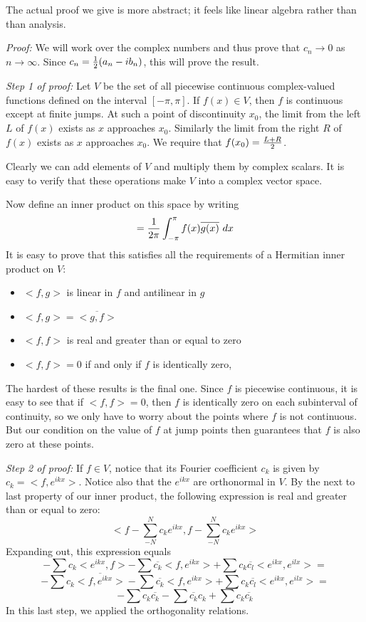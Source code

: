 \documentclass[11pt, oneside]{article}   	%
\begin{document}
The actual proof we give is more abstract; it feels  like linear algebra rather than than analysis.

{\em Proof:} We will work over the complex numbers and thus prove that $c_n \rightarrow 0$ as $n \rightarrow \infty$. Since $c_n = {1 \over 2} (a_n - i b_n)$, this will prove the result.

{\em Step 1 of proof:} Let $V$ be the set of all piecewise continuous complex-valued functions defined on the interval
$[ - \pi, \pi]$. If $f(x) \in V$, then $f$ is continuous except at finite jumps. At such a point of discontinuity $x_0$,
the limit from the left $L$ of $f(x)$ exists as $x$ approaches $x_0$. Similarly the limit from the right $R$ of $f(x)$ exists as $x$ approaches $x_0$. We require that $f(x_0) = {{L + R} \over 2}$.

Clearly we can add elements of $V$ and multiply them by complex scalars. It is easy to verify that these operations make $V$ into a complex vector space.

Now define an inner product on this space by writing \[< f, g > = {1 \over {2 \pi}} \int_{- \pi}^\pi f(x) \overline{g(x)} \ dx\] 
It is easy to prove that this satisfies all the requirements of a Hermitian inner product on $V$:
\begin{itemize}
\item $<f, g>$ is linear in $f$ and antilinear in $g$
\item $<f, g> = \overline{<g, f>}$
\item $<f, f>$ is real and greater than or equal to zero
\item $<f, f> = 0$ if and only if $f$ is identically zero,
\end{itemize}

The hardest of these results is the final one. Since $f$ is piecewise continuous, it is easy to see that if $<f, f> = 0$,
then $f$ is identically zero on each subinterval of continuity, so we only have to worry about the points where $f$ is not continuous.  But our condition on the value of $f$ at jump points then guarantees that $f$ is also zero at these points.

{\em Step 2 of proof:} If $f \in V$, notice that its Fourier coefficient $c_k$ is given by $c_k = <f, e^{ikx}>$. Notice also that the $e^{ikx}$ are orthonormal in $V$. By the next to last property of our inner product, the following expression is real and greater than or equal to zero:
\[ <f - \sum_{-N}^N c_k e^{ikx}, f - \sum_{-N}^N c_k e^{ikx}>\]
Expanding out, this expression equals
\[<f, f> - \sum c_k<e^{ikx}, f> - \sum \overline{c_k} <f, e^{ikx}> + \sum c_k \overline{c_l} <e^{ikx}, e^{ilx}> = \]
\[<f, f> - \sum c_k \overline{<f, e^{ikx}>} - \sum \overline{c_k} <f, e^{ikx}> + \sum c_k \overline{c_l} <e^{ikx}, e^{ilx}> = \]
\[<f, f> - \sum c_k \overline{c_k} - \sum \overline{c_k} c_k + \sum c_k \overline{c_k}\]
In this last step, we applied the orthogonality relations.
\end{document}
